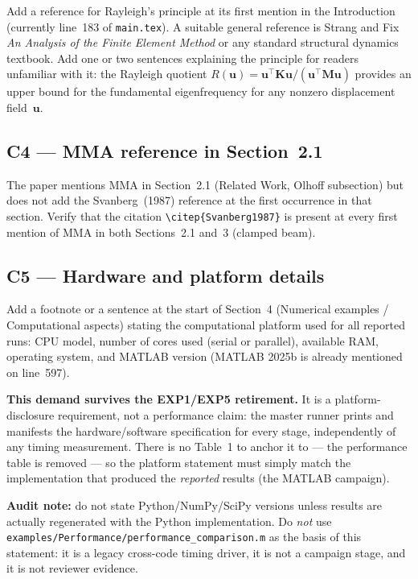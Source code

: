 \documentclass[12pt,a4paper]{article}
\begin{document}
Add a reference for Rayleigh's principle at its first mention in the
Introduction (currently line~183 of \texttt{main.tex}). A suitable
general reference is Strang and Fix \emph{An Analysis of the Finite Element
Method} or any standard structural dynamics textbook. Add one or two sentences
explaining the principle for readers unfamiliar with it: the Rayleigh quotient
$R(\mathbf{u}) = \mathbf{u}^\top\mathbf{K}\mathbf{u}/(\mathbf{u}^\top\mathbf{M}\mathbf{u})$ provides an upper bound for the
fundamental eigenfrequency for any nonzero displacement field~$\mathbf{u}$.

\subsection{C4 — MMA reference in Section~2.1}

The paper mentions MMA in Section~2.1 (Related Work, Olhoff subsection)
but does not add the Svanberg~(1987) reference at the first occurrence in
that section. Verify that the citation \texttt{\textbackslash citep\{Svanberg1987\}}
is present at every first mention of MMA in both Sections~2.1 and~3 (clamped
beam).

\subsection{C5 — Hardware and platform details}

Add a footnote or a sentence at the start of Section~4 (Numerical examples /
Computational aspects) stating the computational platform used for all
reported runs: CPU model, number of cores used (serial or parallel), available
RAM, operating system, and MATLAB version (MATLAB 2025b is already mentioned
on line~597).

\textbf{This demand survives the EXP1/EXP5 retirement.}  It is a
platform-disclosure requirement, not a performance claim: the master runner
prints and manifests the hardware/software specification for every stage,
independently of any timing measurement.  There is no Table~1 to anchor it to
--- the performance table is removed --- so the platform statement must simply
match the implementation that produced the \emph{reported} results (the
MATLAB campaign).

\textbf{Audit note:} do not state Python/NumPy/SciPy versions unless results
are actually regenerated with the Python implementation.  Do \emph{not} use
\texttt{examples/Performance/performance\_comparison.m} as the basis of this
statement: it is a legacy cross-code timing driver, it is not a campaign stage,
and it is not reviewer evidence.
\end{document}
